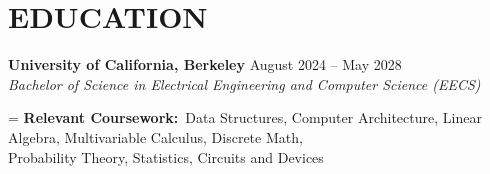 \section*{EDUCATION}
\noindent
\textbf{University of California, Berkeley} \hfill August 2024 -- May 2028 \\
\textit{Bachelor of Science in Electrical Engineering and Computer Science (EECS)}

\noindent
\begingroup
{}%
\hangindent=
\textbf{Relevant Coursework:}\ \nohyphens{Data Structures, Computer Architecture, Linear Algebra, Multivariable Calculus, Discrete Math, \\ Probability Theory, Statistics, Circuits and Devices}
\par
\endgroup
